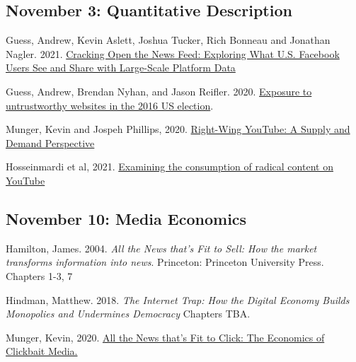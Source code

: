 \vspace{-.1in}\documentclass[11pt]{article}
\begin{document}
\subsection*{November 3: Quantitative Description}






Guess, Andrew, Kevin Aslett, Joshua Tucker, Rich Bonneau and Jonathan Nagler. 2021. \href{https://journalqd.org/article/view/2586}{Cracking Open the News Feed:	Exploring What U.S. Facebook Users See and Share with Large-Scale Platform Data}

\noindent Guess, Andrew, Brendan Nyhan, and Jason Reifler. 2020. \href{https://www.nature.com/articles/s41562-020-0833-x?proof=t}{Exposure to untrustworthy websites in the 2016 US election}.


\noindent Munger, Kevin and Jospeh Phillips, 2020. \href{https://journals.sagepub.com/doi/pdf/10.1177/1940161220964767?casa_token=pNSl7u_rBX0AAAAA:mlH30Wrj5NEIp9nMD459qqBLaUCBlFjwjCwMSGSmd60OIeuomF4XxXH5eBfzk6A3rcmrDE3I9nmK}{Right-Wing YouTube: A Supply and Demand Perspective
}

\noindent Hosseinmardi et al, 2021.  \href{https://www.pnas.org/content/pnas/118/32/e2101967118.full.pdf?casa_token=vI6yIQS3_M8AAAAA:HCt5StQUZ6kzh4X37RqDc0S7qJibnx9wya3wLUZVHjP-Fij7eNUKP1Wb1kpTPFG4k7yvUoRlpdBMEQ}{Examining the consumption of radical content
	on YouTube
}






\subsection*{November 10: Media Economics}

%

\noindent Hamilton, James. 2004. {\it All the News that's Fit to Sell: How the market transforms information into news}. Princeton: Princeton University Press. Chapters 1-3, 7

\noindent Hindman, Matthew. 2018. \textit{The Internet Trap: How the Digital Economy Builds Monopolies and Undermines Democracy} Chapters TBA.


\noindent Munger, Kevin, 2020. \href{https://www.tandfonline.com/doi/pdf/10.1080/10584609.2019.1687626?casa_token=VSjjEXja4EMAAAAA:Q47ASc0lu3itcu7FAjqifqtnrFQvGFvwCJvG9mE1-g7SDLjLNheR6ZtkURoLvRyW7LRFwxmFR0Di}{All the News that's Fit to Click: The Economics of Clickbait Media.}
\end{document}
